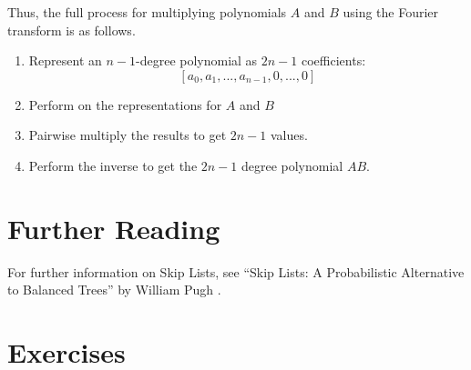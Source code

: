 
Thus, the full process for multiplying polynomials
$A$ and $B$ using the Fourier transform is as follows.
\begin{enumerate}
\item Represent an $n-1$-degree polynomial as $2n-1$ coefficients:
\[[a_0, a_1, ..., a_{n-1}, 0, ..., 0]\]
\item Perform
on the representations for $A$ and $B$
\item Pairwise multiply the results to get $2n-1$ values.
\item Perform the inverse 
to get the $2n-1$ degree polynomial $AB$.
\end{enumerate}

\section{Further Reading}

For further information on Skip Lists,
see ``Skip Lists: A Probabilistic
Alternative to Balanced Trees'' by William Pugh \cite{Pugh}.

\section{Exercises}

